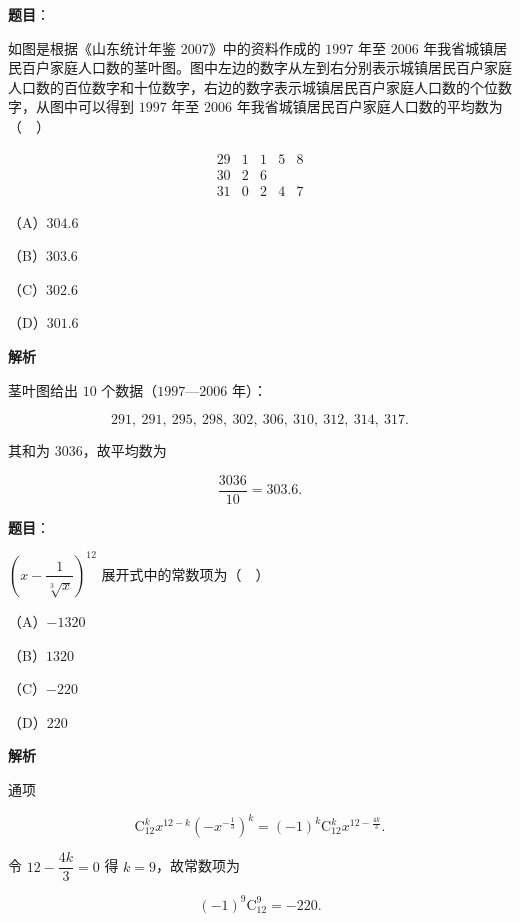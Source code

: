 \begin{answer}

\textbf{题目}：

如图是根据《山东统计年鉴 2007》中的资料作成的 $1997$ 年至 $2006$ 年我省城镇居民百户家庭人口数的茎叶图。图中左边的数字从左到右分别表示城镇居民百户家庭人口数的百位数字和十位数字，右边的数字表示城镇居民百户家庭人口数的个位数字，从图中可以得到 $1997$ 年至 $2006$ 年我省城镇居民百户家庭人口数的平均数为（　）

\nopagebreak[4]
\[\begin{array}{c|cccc}
29&1&1&5&8\\
30&2&6&&\\
31&0&2&4&7
\end{array}\]

（A）$304.6$

（B）$303.6$

（C）$302.6$

（D）$301.6$

\textbf{解析}

茎叶图给出 $10$ 个数据（$1997$—$2006$ 年）：

\nopagebreak[4]
\[291,\ 291,\ 295,\ 298,\ 302,\ 306,\ 310,\ 312,\ 314,\ 317.\]

其和为 $3036$，故平均数为

\nopagebreak[4]
\[\frac{3036}{10}=303.6.\]


\end{answer}
\begin{answer}

\textbf{题目}：

$\left(x-\dfrac1{\sqrt[3]x}\right)^{12}$ 展开式中的常数项为（　）

（A）$-1320$

（B）$1320$

（C）$-220$

（D）$220$

\textbf{解析}

通项

\nopagebreak[4]
\[\mathrm C_{12}^kx^{12-k}\left(-x^{-\frac13}\right)^k=(-1)^k\mathrm C_{12}^kx^{12-\frac{4k}3}.\]

令 $12-\dfrac{4k}3=0$ 得 $k=9$，故常数项为

\nopagebreak[4]
\[(-1)^9\mathrm C_{12}^9=-220.\]


\end{answer}
